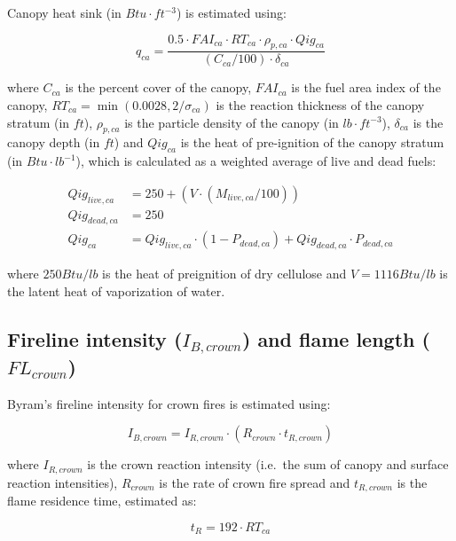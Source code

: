\documentclass[]{book}
\begin{document}
Canopy heat sink (in \(Btu \cdot ft^{-3}\)) is estimated using:

\begin{equation}
q_{ca} = \frac{0.5 \cdot FAI_{ca} \cdot RT_{ca} \cdot \rho_{p, ca} \cdot Qig_{ca}}{(C_{ca}/100)\cdot \delta_{ca}}
\end{equation}

where \(C_{ca}\) is the percent cover of the canopy, \(FAI_{ca}\) is the
fuel area index of the canopy, \(RT_{ca} = \min(0.0028, 2/\sigma_{ca})\)
is the reaction thickness of the canopy stratum (in \(ft\)),
\(\rho_{p, ca}\) is the particle density of the canopy (in
\(lb \cdot ft^{-3}\)), \(\delta_{ca}\) is the canopy depth (in \(ft\))
and \(Qig_{ca}\) is the heat of pre-ignition of the canopy stratum (in
\(Btu \cdot lb^{-1}\)), which is calculated as a weighted average of
live and dead fuels:

\begin{eqnarray}
Qig_{live, ca} &= 250 + (V\cdot (M_{live, ca}/100))\\
Qig_{dead, ca} &= 250\\
Qig_{ca} &= Qig_{live, ca} \cdot (1 - P_{dead, ca})+ Qig_{dead, ca} \cdot P_{dead, ca}
\end{eqnarray}

where \(250 Btu/lb\) is the heat of preignition of dry cellulose and
\(V = 1116 Btu/lb\) is the latent heat of vaporization of water.

\subsection{\texorpdfstring{Fireline intensity (\(I_{B,crown}\)) and
flame length
(\(FL_{crown}\))}{Fireline intensity (I\_\{B,crown\}) and flame length (FL\_\{crown\})}}\label{fireline-intensity-i_bcrown-and-flame-length-fl_crown}

Byram's fireline intensity for crown fires is estimated using:

\begin{equation}
I_{B,crown} = I_{R,crown} \cdot (R_{crown} \cdot t_{R,crown})
\end{equation}

where \(I_{R,crown}\) is the crown reaction intensity (i.e.~the sum of
canopy and surface reaction intensities), \(R_{crown}\) is the rate of
crown fire spread and \(t_{R,crown}\) is the flame residence time,
estimated as:

\begin{equation}
t_R = 192 \cdot RT_{ca}
\end{equation}
\end{document}
